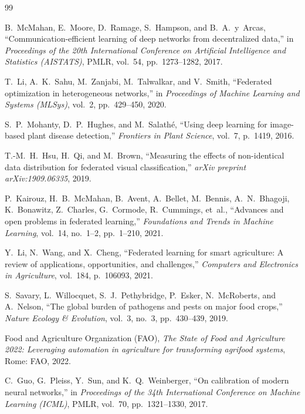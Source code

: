 \documentclass[applsci,article,submit,oneauthor,pdftex]{Definitions/mdpi}
\begin{document}
\begin{thebibliography}{99}
\label{sec:references}

B.~McMahan, E.~Moore, D.~Ramage, S.~Hampson, and B.~A.~y~Arcas,
``Communication-efficient learning of deep networks from decentralized data,''
in \textit{Proceedings of the 20th International Conference on Artificial Intelligence and Statistics (AISTATS)},
PMLR, vol.~54, pp.~1273--1282, 2017.

T.~Li, A.~K.~Sahu, M.~Zanjabi, M.~Talwalkar, and V.~Smith,
``Federated optimization in heterogeneous networks,''
in \textit{Proceedings of Machine Learning and Systems (MLSys)},
vol.~2, pp.~429--450, 2020.

S.~P.~Mohanty, D.~P.~Hughes, and M.~Salath{\'e},
``Using deep learning for image-based plant disease detection,''
\textit{Frontiers in Plant Science},
vol.~7, p.~1419, 2016.

T.-M.~H.~Hsu, H.~Qi, and M.~Brown,
``Measuring the effects of non-identical data distribution for federated visual classification,''
\textit{arXiv preprint arXiv:1909.06335}, 2019.

P.~Kairouz, H.~B.~McMahan, B.~Avent, A.~Bellet, M.~Bennis, A.~N.~Bhagoji, K.~Bonawitz, Z.~Charles, G.~Cormode, R.~Cummings, et~al.,
``Advances and open problems in federated learning,''
\textit{Foundations and Trends in Machine Learning},
vol.~14, no.~1--2, pp.~1--210, 2021.

Y.~Li, N.~Wang, and X.~Cheng,
``Federated learning for smart agriculture: A review of applications, opportunities, and challenges,''
\textit{Computers and Electronics in Agriculture},
vol.~184, p.~106093, 2021.

S.~Savary, L.~Willocquet, S.~J.~Pethybridge, P.~Esker, N.~McRoberts, and A.~Nelson,
``The global burden of pathogens and pests on major food crops,''
\textit{Nature Ecology \& Evolution},
vol.~3, no.~3, pp.~430--439, 2019.

Food and Agriculture Organization (FAO),
\textit{The State of Food and Agriculture 2022: Leveraging automation in agriculture for transforming agrifood systems},
Rome: FAO, 2022.

C.~Guo, G.~Pleiss, Y.~Sun, and K.~Q.~Weinberger,
``On calibration of modern neural networks,''
in \textit{Proceedings of the 34th International Conference on Machine Learning (ICML)},
PMLR, vol.~70, pp.~1321--1330, 2017.


\end{thebibliography}
\end{document}

